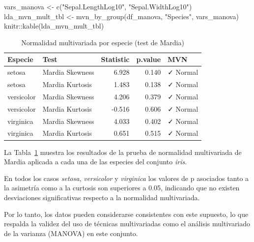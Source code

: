 \documentclass[
  spanish,
  11pt,
  a4paper,
  DIV=11,
  numbers=noendperiod]{scrartcl}
\newenvironment{Shaded}{\begin{snugshade}}{\end{snugshade}}
\newcommand{\FunctionTok}[1]{\textcolor[rgb]{0.28,0.35,0.67}{#1}}
\newcommand{\NormalTok}[1]{\textcolor[rgb]{0.00,0.23,0.31}{#1}}
\newcommand{\OtherTok}[1]{\textcolor[rgb]{0.00,0.23,0.31}{#1}}
\newcommand{\SpecialCharTok}[1]{\textcolor[rgb]{0.37,0.37,0.37}{#1}}
\newcommand{\StringTok}[1]{\textcolor[rgb]{0.13,0.47,0.30}{#1}}
\begin{document}
\begin{Shaded}
\begin{Highlighting}[numbers=left,,]
\NormalTok{vars\_manova }\OtherTok{\textless{}{-}} \FunctionTok{c}\NormalTok{(}\StringTok{"Sepal.LengthLog10"}\NormalTok{, }\StringTok{"Sepal.WidthLog10"}\NormalTok{)}
\NormalTok{lda\_mvn\_mult\_tbl }\OtherTok{\textless{}{-}} \FunctionTok{mvn\_by\_group}\NormalTok{(df\_manova, }\StringTok{"Species"}\NormalTok{, vars\_manova)}
\NormalTok{knitr}\SpecialCharTok{::}\FunctionTok{kable}\NormalTok{(lda\_mvn\_mult\_tbl)}
\end{Highlighting}
\end{Shaded}

\begin{longtable}[]{@{}llrrl@{}}

\caption{\label{tbl-manova-mvn-mult}Normalidad multivariada por especie
(test de Mardia)}

\tabularnewline

\toprule\noalign{}
Especie & Test & Statistic & p.value & MVN \\
\midrule\noalign{}
\endhead
\bottomrule\noalign{}
\endlastfoot
setosa & Mardia Skewness & 6.928 & 0.140 & ✓ Normal \\
setosa & Mardia Kurtosis & 1.483 & 0.138 & ✓ Normal \\
versicolor & Mardia Skewness & 4.206 & 0.379 & ✓ Normal \\
versicolor & Mardia Kurtosis & -0.516 & 0.606 & ✓ Normal \\
virginica & Mardia Skewness & 4.033 & 0.402 & ✓ Normal \\
virginica & Mardia Kurtosis & 0.651 & 0.515 & ✓ Normal \\

\end{longtable}

La Tabla~\ref{tbl-manova-mvn-mult} muestra los resultados de la prueba
de normalidad multivariada de Mardia aplicada a cada una de las especies
del conjunto \emph{iris}.

En todos los casos \emph{setosa}, \emph{versicolor} y \emph{virginica}
los valores de p asociados tanto a la asimetría como a la curtosis son
superiores a 0.05, indicando que no existen desviaciones significativas
respecto a la normalidad multivariada.

Por lo tanto, los datos pueden considerarse consistentes con este
supuesto, lo que respalda la validez del uso de técnicas multivariadas
como el análisis multivariado de la varianza (MANOVA) en este conjunto.
\end{document}
